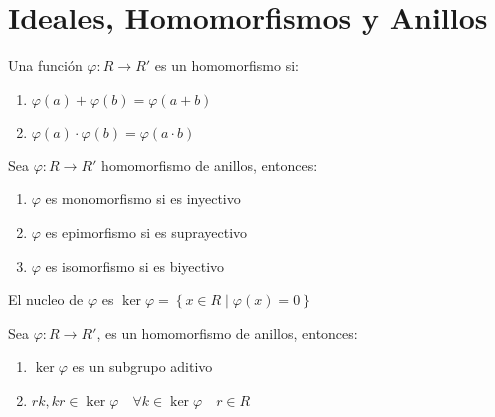 
\newpage
\section{Ideales, Homomorfismos y Anillos}
    \begin{definicion}
        Una función $\varphi: R \to R'$ es un homomorfismo si:

        \begin{enumerate}
            \item $\varphi(a) + \varphi(b) = \varphi(a + b)$
            \item $\varphi(a) \cdot \varphi(b) = \varphi(a \cdot b)$
        \end{enumerate}
    \end{definicion}

    \begin{definicion}
        Sea $\varphi: R \to R'$ homomorfismo de anillos, entonces:
        \begin{enumerate}
            \item $\varphi$ es monomorfismo si es inyectivo
            \item $\varphi$ es epimorfismo si es suprayectivo
            \item $\varphi$ es isomorfismo si es biyectivo
        \end{enumerate}
    \end{definicion}

    \begin{definicion}
        El nucleo de $\varphi$ es $\ker{\varphi} = \left\{ x \in R \mid \varphi(x) = 0 \right\}$
    \end{definicion}

    \begin{proposicion}
        Sea $\varphi:R \to R'$, es un homomorfismo de anillos, entonces:

        \begin{enumerate}
            \item $\ker{\varphi}$ es un subgrupo aditivo
            \item $rk, kr \in \ker{\varphi} \quad \forall k \in \ker{\varphi} \quad r \in R$
        \end{enumerate}
    \end{proposicion}


